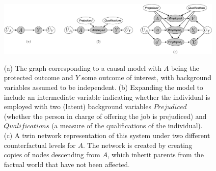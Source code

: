 \begin{figure}[th!]
\begin{center}
\vspace{-1ex}
\centerline{\includegraphics[width=\textwidth]{implications_fig.pdf}}
\vspace{-2ex}
\label{fig:ex1}
  \caption{(a) The graph corresponding to a causal model with $A$ being the protected outcome
    and $Y$ some outcome of interest, with background variables assumed to be independent.
    (b) Expanding the model to include an intermediate variable indicating whether the individual
    is employed with two (latent) background variables $Prejudiced$ (whether the person in charge
    of offering the job is prejudiced) and $Qualifications$ (a measure of the qualifications of
    the individual). (c) A twin network representation of this system \citep{pearl:00}
    under two different counterfactual levels for $A$. The network is created by creating copies
    of nodes descending from $A$, which inherit parents from the factual world that have not
    been affected.}
\vspace{-2ex}
\end{center}

\end{figure}

